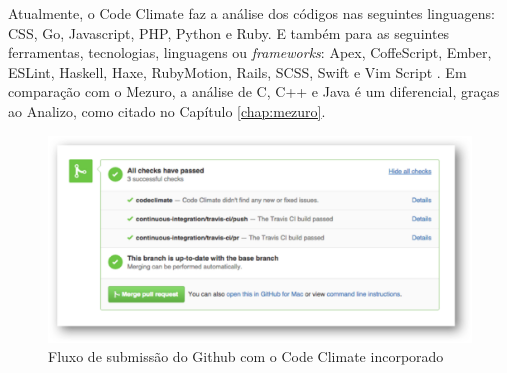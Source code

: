 Atualmente, o Code Climate faz a análise dos códigos nas seguintes linguagens:
CSS, Go, Javascript, PHP, Python e Ruby. E também para as seguintes ferramentas,
tecnologias, linguagens ou \textit{frameworks}: Apex, CoffeScript, Ember, ESLint,
Haskell, Haxe, RubyMotion, Rails, SCSS, Swift e Vim Script \cite{codeClimateDoc}.
Em comparação com o Mezuro, a análise de C, C++ e Java é um diferencial, graças
ao Analizo, como citado no Capítulo \ref{chap:mezuro}.

\begin{figure}[!htb]
	\centering
    \includegraphics[keepaspectratio=true,scale=0.5]
    {figuras/github_workflow_with_codeclimate.eps}
  \caption{Fluxo de submissão do Github com o Code Climate incorporado}
  \label{fig:github_workflow_with_codeclimate}
\end{figure}

